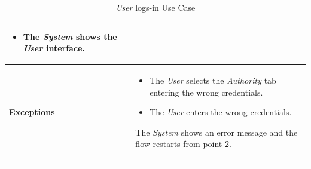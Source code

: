 \documentclass {article}
\begin{document}
\begin{longtable}{| p{3 cm} | p{10.5 cm} |}
\begin{itemize}
				\item The {\it System} shows the {\it User} interface.
			\end{itemize}
			\\
			\hline
			{\bf Exceptions} & 	
			\begin{itemize}
				\item The {\it User} selects the {\it Authority} tab entering the wrong credentials. 
				\item The {\it User} enters the wrong credentials.
			\end{itemize}
			The {\it System} shows an error message and the flow restarts from point 2. \\
			\hline
			\caption{{\it User} logs-in Use Case}
			\end{longtable}
			
			\pagebreak
			
\end{document}
